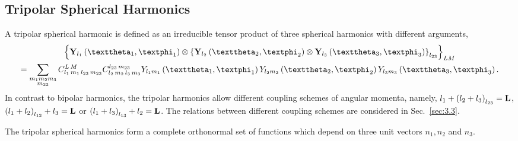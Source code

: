 \subsection{Tripolar Spherical Harmonics}\label{sec:5.16.2}
A tripolar spherical harmonic is defined as an irreducible tensor product of three spherical harmonics with different arguments,
\begin{multline}
\left\{\vect{Y}_{l_{1}}\left(\vartheta_{1}, \varphi_{1}\right) \otimes\left\{\vect{Y}_{l_{2}}\left(\vartheta_{2}, \varphi_{2}\right) \otimes \vect{Y}_{l_{3}}\left(\vartheta_{3}, \varphi_{3}\right)\right\}_{l_{23}}\right\}_{L M}  \\
=\sum_{\substack{m_{1} m_{2} m_{3} \\
m_{23}}} \clebsch{l_{1}}{m_{1}}{l_{23}}{m_{23}}{L}{M} \clebsch{l_{2}}{m_{2}}{l_{3}}{m_{3}}{l_{23}}{m_{23}} Y_{l_{1} m_{1}}\left(\vartheta_{1}, \varphi_{1}\right) Y_{l_{2} m_{2}}\left(\vartheta_{2}, \varphi_{2}\right) Y_{l_{3} m_{3}}\left(\vartheta_{3}, \varphi_{3}\right). \label{eq:5:16:11}
\end{multline}
In contrast to bipolar harmonics, the tripolar harmonics allow different coupling schemes of angular momenta, namely, $l_{1}+\left(l_{2}+l_{3}\right)_{l_{23}}=\mathbf{L}$, $\left(l_{1}+l_{2}\right)_{l_{12}}+l_{3}=\mathbf{L}$ or $\left(l_{1}+l_{3}\right)_{l_{13}}+l_{2}=\mathbf{L}$. The relations between different coupling schemes are considered in Sec.~\ref{sec:3.3}.

The tripolar spherical harmonics form a complete orthonormal set of functions which depend on three unit vectors $n_{1}, n_{2}$ and $n_{3}$.

